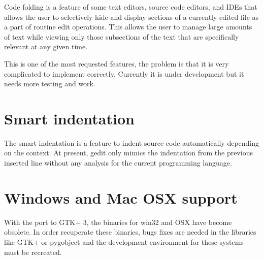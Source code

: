 Code folding is a feature of some text editors, source code editors, and IDEs that allows the user to selectively hide and display sections of a currently edited file as a part of routine edit operations. This allows the user to manage large amounts of text while viewing only those subsections of the text that are specifically relevant at any given time.\cite{website:code-folding}

This is one of the most requested features, the problem is that it is very complicated to implement correctly. Currently it is under development but it needs more testing and work.

\section{Smart indentation}

The smart indentation is a feature to indent source code automatically depending on the context. At present, gedit only mimics the indentation from the previous inserted line without any analysis for the current programming language.

\section{Windows and Mac OSX support}

With the port to GTK+ 3, the binaries for win32 and OSX have become obsolete. In order recuperate these binaries, bugs fixes are needed in the libraries like GTK+ or pygobject and the development environment for these systems must be recreated.

